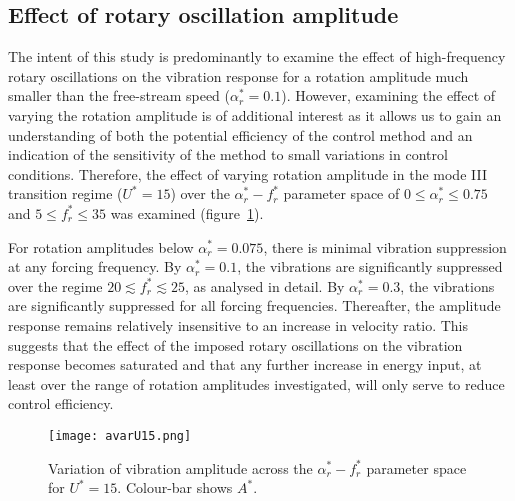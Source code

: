 \documentclass[3p]{elsarticle}
\newcommand{\Astar}{\ensuremath{A^{*}}}
\newcommand{\Ustar}{\ensuremath{U^{*}}}
\newcommand{\velrat}{\ensuremath{\alpha_r^*}}
\newcommand{\freqrat}{\ensuremath{f_r^*}}
\begin{document}
\subsection{Effect of rotary oscillation amplitude} \label{sec:rotamp}
%
The intent of this study is predominantly to examine the effect of
high-frequency rotary oscillations on the vibration response for a rotation amplitude much smaller than the free-stream speed ($\velrat=0.1$). However, examining the effect of varying the rotation amplitude is of additional interest
as it allows us to gain an understanding of both the potential
efficiency of the control method and an indication of the sensitivity
of the method to small variations in control conditions. Therefore, the effect of varying rotation amplitude in the mode III transition regime ($\Ustar=15$)
over the $\velrat - \freqrat$ parameter space of $0\leq\velrat\leq0.75$ and $5\leq\freqrat\leq35$ was examined (figure~\ref{fig:ampvar}).

For rotation amplitudes below $\velrat=0.075$, there is minimal
vibration suppression at any forcing frequency. By $\velrat=0.1$, the
vibrations are significantly suppressed over the regime
$20\lesssim\freqrat\lesssim25$, as analysed in detail. By $\velrat=0.3$, the vibrations are significantly
suppressed for all forcing frequencies. Thereafter, the amplitude
response remains relatively insensitive to an increase in velocity
ratio. This suggests that the effect of the imposed rotary
oscillations on the vibration response becomes saturated and that any
further increase in energy input, at least over the range of rotation
amplitudes investigated, will only serve to reduce control efficiency.
%
\begin{figure}
	\centering
	\texttt{[image: avarU15.png]} %
	\caption{Variation of vibration amplitude across the $\velrat -
		\freqrat$ parameter space for $\Ustar=15$. Colour-bar shows
		\Astar.}
	\label{fig:ampvar}
\end{figure}
%
\end{document}
